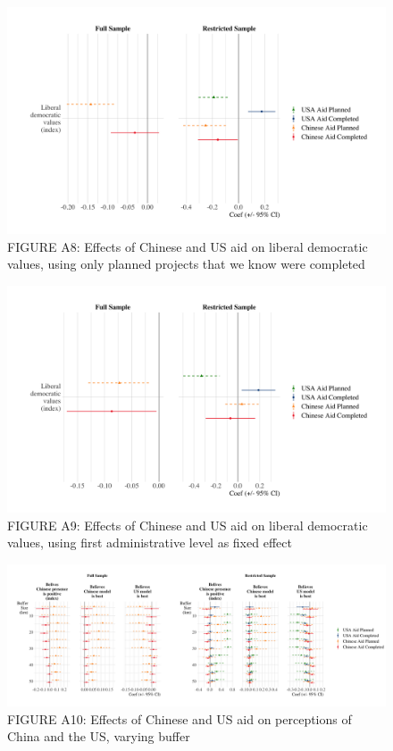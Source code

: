 \documentclass[9pt]{article}
\begin{document}
\begin{figure}[H]
\centering
\includegraphics[width=1\textwidth]{figures/figure_a8.png}
\caption{FIGURE A8: Effects of Chinese and US aid on liberal democratic values, using only planned projects that we know were completed}
\end{figure}

\begin{figure}[H]
\centering
\includegraphics[width=1\textwidth]{figures/figure_a9.png}
\caption{FIGURE A9: Effects of Chinese and US aid on liberal democratic values, using first administrative level as fixed effect}
\end{figure}

\begin{figure}[H]
\centering
\includegraphics[width=1\textwidth]{figures/figure_a10.png}
\caption{FIGURE A10: Effects of Chinese and US aid on perceptions of China and the US, varying buffer}
\end{figure}
\end{document}
